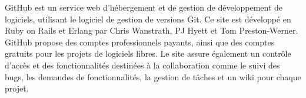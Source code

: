 \documentclass[a4paper]{report}
\begin{document}
\begin{spacing}{2}
\begin{minipage}{0.2\textwidth}
	\begin{minipage}{\linewidth}
	\end{minipage}
\end{minipage}
\hfill
\begin{minipage}{0.75\textwidth}
GitHub est un service web d'hébergement et de gestion de développement de logiciels, utilisant le logiciel de gestion de versions Git. Ce site est développé en Ruby on Rails et Erlang par Chris Wanstrath, PJ Hyett et Tom Preston-Werner. GitHub propose des comptes professionnels payants, ainsi que des comptes gratuits pour les projets de logiciels libres. Le site assure également un contrôle d'accès et des fonctionnalités destinées à la collaboration comme le suivi des bugs, les demandes de fonctionnalités, la gestion de tâches et un wiki pour chaque projet.\\
\end{minipage}\\


\end{spacing}
\end{document}
